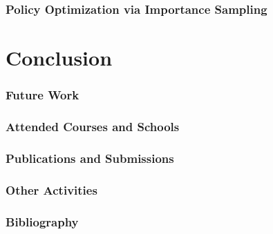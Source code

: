 \documentclass{beamer}
\begin{document}
\begin{frame}
\frametitle{Policy Optimization via Importance Sampling}


\end{frame}

\section{Conclusion}


\begin{frame}
\frametitle{Future Work}


\end{frame}


\begin{frame}
\frametitle{Attended Courses and Schools}


\end{frame}


\begin{frame}
\frametitle{Publications and Submissions}


\end{frame}


\begin{frame}
\frametitle{Other Activities}


\end{frame}


\begin{frame}
\frametitle{Bibliography}



\end{frame}

\end{document}
